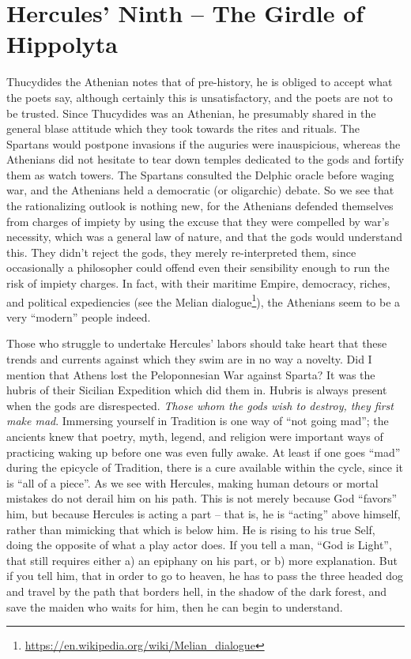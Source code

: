 \section{Hercules’ Ninth – The Girdle of Hippolyta}

Thucydides the Athenian notes that of pre-history, he is obliged to accept what the poets say, although certainly this is unsatisfactory, and the poets are not to be trusted. Since Thucydides was an Athenian, he presumably shared in the general blase attitude which they took towards the rites and rituals. The Spartans would postpone invasions if the auguries were inauspicious, whereas the Athenians did not hesitate to tear down temples dedicated to the gods and fortify them as watch towers. The Spartans consulted the Delphic oracle before waging war, and the Athenians held a democratic (or oligarchic) debate. So we see that the rationalizing outlook is nothing new, for the Athenians defended themselves from charges of impiety by using the excuse that they were compelled by war's necessity, which was a general law of nature, and that the gods would understand this. They didn't reject the gods, they merely re-interpreted them, since occasionally a philosopher could offend even their sensibility enough to run the risk of impiety charges. In fact, with their maritime Empire, democracy, riches, and political expediencies (see the Melian dialogue\footnote{\url{https://en.wikipedia.org/wiki/Melian\_dialogue}}), the Athenians seem to be a very ``modern'' people indeed.

Those who struggle to undertake Hercules' labors should take heart that these trends and currents against which they swim are in no way a novelty. Did I mention that Athens lost the Peloponnesian War against Sparta? It was the hubris of their Sicilian Expedition which did them in. Hubris is always present when the gods are disrespected. \emph{Those whom the gods wish to destroy, they first make mad}. Immersing yourself in Tradition is one way of ``not going mad''; the ancients knew that poetry, myth, legend, and religion were important ways of practicing waking up before one was even fully awake. At least if one goes ``mad'' during the epicycle of Tradition, there is a cure available within the cycle, since it is ``all of a piece''. As we see with Hercules, making human detours or mortal mistakes do not derail him on his path. This is not merely because God ``favors'' him, but because Hercules is acting a part -- that is, he is ``acting'' above himself, rather than mimicking that which is below him. He is rising to his true Self, doing the opposite of what a play actor does. If you tell a man, ``God is Light'', that still requires either a) an epiphany on his part, or b) more explanation. But if you tell him, that in order to go to heaven, he has to pass the three headed dog and travel by the path that borders hell, in the shadow of the dark forest, and save the maiden who waits for him, then he can begin to understand.

